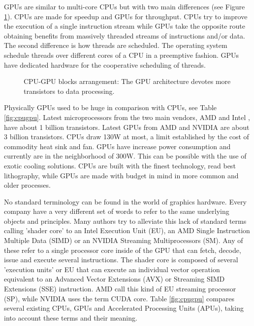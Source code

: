\documentclass[prodmode,acmtecs]{acmsmall}
\begin{document}
GPUs are similar to multi-core CPUs but with two main differences (see Figure \ref{figure:captura2paperCEC}). CPUs are made for speedup and GPUs for throughput. CPUs try to improve the execution of a single instruction stream while GPUs take the opposite route obtaining benefits from massively threaded streams of instructions and/or data. The second difference is how threads are scheduled. The operating system schedule threads over different cores of a CPU in a preemptive fashion. GPUs have dedicated hardware for the cooperative scheduling of threads.

\begin{figure}[ht]
\centerline{}
\caption{CPU-GPU blocks arrangement: The GPU architecture devotes more transistors to data processing.}
\label{figure:captura2paperCEC}
\end{figure}

Physically GPUs used to be huge in comparison with CPUs, see Table \ref{fig:cpugpu}. Latest microprocessors from the two main vendors, AMD \cite{amd} and Intel \cite{intel}, have about 1 billion transistors. Latest GPUs from AMD and NVIDIA \cite{nvidia} are about 3 billion transistors. CPUs draw 130W at most, a limit established by the cost of commodity heat sink and fan. GPUs have increase power consumption and currently are in the neighborhood of 300W. This can be possible with the use of exotic cooling solutions. CPUs are built with the finest technology, read best lithography, while GPUs are made with budget in mind in more common and older processes.

No standard terminology can be found in the world of graphics hardware.
Every company have a very different set of words to refer to the same underlying objects and principles. Many authors try to alleviate this lack of standard terms calling 'shader core' to an Intel Execution Unit (EU), an AMD Single Instruction Multiple Data (SIMD) or an NVIDIA Streaming Multiprocessors (SM). Any of these refer to a single processor core inside of the GPU that can fetch, decode, issue and execute several instructions. The shader core is composed of several 'execution units' or EU that can execute an individual vector operation equivalent to an Advanced Vector Extensions (AVX) or Streaming SIMD Extensions (SSE) instruction. AMD call this kind of EU streaming processor (SP), while NVIDIA uses the term CUDA core. Table \ref{fig:cpugpu} compares several existing CPUs, GPUs and Accelerated Processing Units (APUs), taking into account these terms and their meaning.
\end{document}
